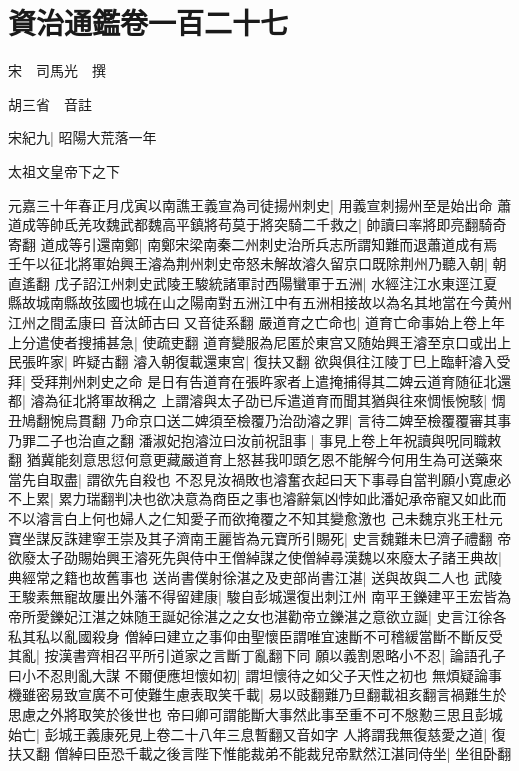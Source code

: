 \chapter{資治通鑑卷一百二十七}
宋　司馬光　撰

胡三省　音註

宋紀九|{
	昭陽大荒落一年}


太祖文皇帝下之下

元嘉三十年春正月戊寅以南譙王義宣為司徒揚州刺史|{
	用義宣刺揚州至是始出命}
蕭道成等帥氐羌攻魏武都魏高平鎮將苟莫于將突騎二千救之|{
	帥讀曰率將即亮翻騎奇寄翻}
道成等引還南鄭|{
	南鄭宋梁南秦二州刺史治所兵志所謂知難而退蕭道成有焉}
壬午以征北將軍始興王濬為荆州刺史帝怒未解故濬久留京口既除荆州乃聽入朝|{
	朝直遙翻}
戊子詔江州刺史武陵王駿統諸軍討西陽蠻軍于五洲|{
	水經注江水東逕江夏縣故城南縣故弦國也城在山之陽南對五洲江中有五洲相接故以為名其地當在今黄州江州之間孟康曰音汰師古曰又音徒系翻}
嚴道育之亡命也|{
	道育亡命事始上卷上年}
上分遣使者搜捕甚急|{
	使疏吏翻}
道育變服為尼匿於東宫又随始興王濬至京口或出上民張旿家|{
	旿疑古翻}
濬入朝復載還東宫|{
	復扶又翻}
欲與俱往江陵丁巳上臨軒濬入受拜|{
	受拜荆州刺史之命}
是日有告道育在張旿家者上遣掩捕得其二婢云道育随征北還都|{
	濬為征北將軍故稱之}
上謂濬與太子劭已斥遣道育而聞其猶與往來惆悵惋駭|{
	惆丑鳩翻惋烏貫翻}
乃命京口送二婢須至檢覆乃治劭濬之罪|{
	言待二婢至檢覆覆審其事乃罪二子也治直之翻}
潘淑妃抱濬泣曰汝前祝詛事|{
	事見上卷上年祝讀與呪同職敕翻}
猶冀能刻意思愆何意更藏嚴道育上怒甚我叩頭乞恩不能解今何用生為可送藥來當先自取盡|{
	謂欲先自殺也}
不忍見汝禍敗也濬奮衣起曰天下事尋自當判願小寛慮必不上累|{
	累力瑞翻判决也欲决意為商臣之事也濬辭氣凶悖如此潘妃承帝寵又如此而不以濬言白上何也婦人之仁知愛子而欲掩覆之不知其變愈激也}
己未魏京兆王杜元寶坐謀反誅建寧王崇及其子濟南王麗皆為元寶所引賜死|{
	史言魏難未巳濟子禮翻}
帝欲廢太子劭賜始興王濬死先與侍中王僧綽謀之使僧綽尋漢魏以來廢太子諸王典故|{
	典經常之籍也故舊事也}
送尚書僕射徐湛之及吏部尚書江湛|{
	送與故與二人也}
武陵王駿素無寵故屢出外藩不得留建康|{
	駿自彭城還復出刺江州}
南平王鑠建平王宏皆為帝所愛鑠妃江湛之妹随王誕妃徐湛之之女也湛勸帝立鑠湛之意欲立誕|{
	史言江徐各私其私以亂國殺身}
僧綽曰建立之事仰由聖懷臣謂唯宜速斷不可稽緩當斷不斷反受其亂|{
	按漢書齊相召平所引道家之言斷丁亂翻下同}
願以義割恩略小不忍|{
	論語孔子曰小不忍則亂大謀}
不爾便應坦懷如初|{
	謂坦懷待之如父子天性之初也}
無煩疑論事機雖密易致宣廣不可使難生慮表取笑千載|{
	易以豉翻難乃旦翻載祖亥翻言禍難生於思慮之外將取笑於後世也}
帝曰卿可謂能斷大事然此事至重不可不慇懃三思且彭城始亡|{
	彭城王義康死見上卷二十八年三息暫翻又音如字}
人將謂我無復慈愛之道|{
	復扶又翻}
僧綽曰臣恐千載之後言陛下惟能裁弟不能裁兒帝默然江湛同侍坐|{
	坐徂卧翻}
